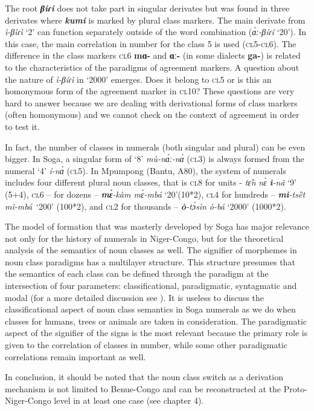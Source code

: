 The root \textbf{\textit{βiɾi}} does not take part in singular derivates but was found in three derivates where \textbf{\textit{kumi}} is marked by plural class markers. The main derivate from \textit{ì-βìɾì} ‘2’ can function separately outside of the word combination (\textit{{\`{ɑ}}ː-βíɾí} ‘20’). In this case, the main correlation in number for the class 5 is used (\textsc{cl}5-\textsc{cl}6). The difference in the class markers \textsc{cl}6 \textbf{mɑ-} and \textbf{ɑː-} (in some dialects \textbf{ga-}) is related to the characteristics of the paradigms of agreement markers. A question about the nature of \textit{ì-βíɾì} in ‘2000’ emerges. Does it belong to \textsc{cl}5 or is this an homonymous form of the agreement marker in \textsc{cl}10? These questions are very hard to answer because we are dealing with derivational forms of class markers (often homonymous) and we cannot check on the context of agreement in order to test it. 

In fact, the number of classes in numerals (both singular and plural) can be even bigger. In Soga, a singular form of `8' \textit{m{\`{u}}-n{\'{ɑ}}ː-n{\`{ɑ}}} (\textsc{cl}3) is always formed from the numeral `4' \textit{í-n{\`{ɑ}}}  (\textsc{cl}5). In Mpumpong (Bantu, A80), the system of numerals includes four different plural noun classes, that is \textsc{cl}8 for units - \textit{t{\^{ɛ}}n} \textit{n{\`{ɛ}}} \textbf{\textit{ì}}\textit{-nâ} ‘9’~ (5+4), \textsc{cl}6 – for dozens – \textbf{\textit{m{\`{ɛ}}}}\textit{-k{\`{a}}m m{\`{ɛ}}-mbá} ‘20’(10*2), \textsc{cl}4  for hundreds – \textbf{\textit{mì}}\textit{-tsȅt mì-mbá}~‘200’ (100*2), and \textsc{cl}2  for thousands – \textbf{\textit{{\`{o}}}}\textit{-t{\'{ɔ}}sìn {\`{o}}-bá} ‘2000’ (1000*2).

The model of formation that was masterly developed by Soga has major relevance not only for the history of numerals in Niger-Congo, but for the theoretical analysis of the semantics of noun classes as well. The signifier of morphemes in noun class paradigms has a multilayer structure. This structure presumes that the semantics of each class can be defined through the paradigm at the intersection of four parameters: classificational, paradigmatic, syntagmatic and modal (for a more detailed discussion see \citealt{Pozdniakov2003}). It is useless to discuss the classificational aspect of noun class semantics in Soga numerals as we do when classes for humans, trees or animals are taken in consideration. The paradigmatic aspect of the signifier of the signs is the most relevant because the primary role is given to the correlation of classes in number, while some other paradigmatic correlations remain important as well. 

In conclusion, it should be noted that the noun class switch as a derivation mechanism is not limited to Benue-Congo and can be reconstructed at the Proto-Niger-Congo level in at least one case (see chapter 4). 